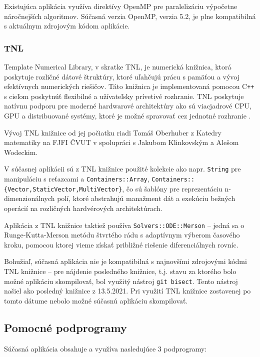 Existujúca aplikácia využíva direktívy OpenMP pre paralelizáciu výpočetne náročnejších algoritmov. Súčasná verzia OpenMP, verzia 5.2, je plne kompatibilná s aktuálnym zdrojovým kódom aplikácie.

\subsubsection {TNL}\label{tnl}

Template Numerical Library, v skratke TNL, je numerická knižnica, ktorá poskytuje rozličné dátové štruktúry, ktoré uľahčujú prácu s pamäťou a vývoj efektívnych numerických riešičov. Táto knižnica je implementovaná pomocou C\texttt{++} s cieľom poskytnúť flexibilné a užívateľsky prívetivé rozhranie. TNL poskytuje natívnu podporu pre moderné hardwarové architektúry ako sú viacjadrové CPU, GPU a distribuované systémy, ktoré je možné spravovať cez jednotné rozhranie \cite{tnl_description}.

Vývoj TNL knižnice od jej počiatku riadi Tomáš Oberhuber z Katedry matematiky na FJFI ČVUT v spolupráci s Jakubom Klinkovským a Alešom Wodeckim.

V súčasnej aplikácii sú z TNL knižnice použité kolekcie ako napr. \texttt{String} pre manipuláciu s reťazcami a \texttt{Containers::Array}, \texttt{Containers::\{Vector,StaticVector,MultiVector\}}, čo sú šablóny pre reprezentáciu n-dimenzionálnych polí, ktoré abstrahujú manažment dát a exekúciu bežných operácií na rozličných hardvérových architektúrach.

Aplikácia z TNL knižnice taktiež používa \texttt{Solvers::ODE::Merson} -- jedná sa o Runge-Kutta-Merson metódu štvrtého rádu s adaptívnym výberom časového kroku, pomocou ktorej vieme získať približné riešenie diferenciálnych rovníc.

Bohužiaľ, súčasná aplikácia nie je kompatibilná s najnovšími zdrojovými kódmi TNL knižnice -- pre nájdenie posledného  knižnice, t.j. stavu za ktorého bolo možné aplikáciu skompilovať, bol využitý nástroj \texttt{git bisect}. Tento nástroj našiel ako posledný  knižnice z 13.5.2021. Pri využití TNL knižnice zostavenej po tomto dátume nebolo možné súčasnú aplikáciu skompilovať.

\subsection {Pomocné podprogramy}\label{podprogramy}

Súčasná aplikácia obsahuje a využíva nasledujúce 3 podprogramy:

